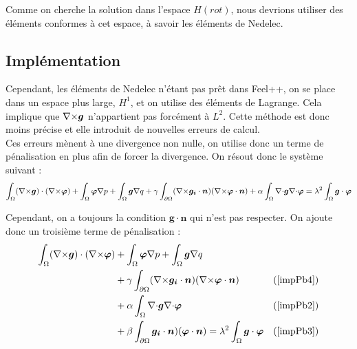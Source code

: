 Comme on cherche la solution dans l'espace $H(rot)$, nous devrions utiliser des éléments conformes à cet espace, à savoir les éléments de Nedelec.\\
\subsection{Implémentation}

Cependant, les éléments de Nedelec n'étant pas prêt dans Feel++, on se place dans un espace plus large, $H^1$, et on utilise des éléments de Lagrange. Cela implique que ${\nabla\times}\bm{g}$ n'appartient pas forcément à $L^2$. Cette méthode est donc moins précise et elle introduit de nouvelles erreurs de calcul.\\

Ces erreurs mènent à une divergence non nulle, on utilise donc un terme de pénalisation en plus afin de forcer la divergence. On résout donc le système suivant :
\[ \int_\Omega ({\nabla\times}\bm{g})\cdot({\nabla\times}\bm{\varphi}) + \int_\Omega\bm{\varphi}{\nabla} p + \int_\Omega \bm{g}{\nabla} q + \gamma\int_{\partial\Omega}({\nabla\times}\bm{g_i}\cdot\bm{n})({\nabla\times}\bm{\varphi}\cdot\bm{n}) + \alpha\int_\Omega {\nabla\cdot}\bm{g}{\nabla\cdot}\bm{\varphi} = \lambda^2\int_\Omega \bm{g}\cdot\bm{\varphi} \]

Cependant, on a toujours la condition $\bm{g}\cdot\bm{n}$ qui n'est pas respecter. On ajoute donc un troisième terme de pénalisation :
\begin{align*}
\int_\Omega ({\nabla\times}\bm{g})\cdot({\nabla\times}\bm{\varphi}) &+ \int_\Omega\bm{\varphi}{\nabla} p + \int_\Omega \bm{g}{\nabla} q & \\
&+ \gamma\int_{\partial\Omega}({\nabla\times}\bm{g_i}\cdot\bm{n})({\nabla\times}\bm{\varphi}\cdot\bm{n}) & (\ref{impPb4})\\
& + \alpha\int_\Omega {\nabla\cdot}\bm{g}{\nabla\cdot}\bm{\varphi} & (\ref{impPb2})\\
&+ \beta\int_{\partial\Omega}\bm{g_i}\cdot\bm{n})(\bm{\varphi}\cdot\bm{n})  = \lambda^2\int_\Omega \bm{g}\cdot\bm{\varphi} & (\ref{impPb3})
\end{align*}

